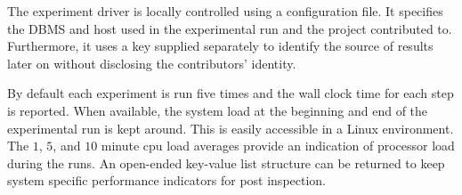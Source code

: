 \documentclass{cidr-2019}
\begin{document}
The experiment driver is locally controlled using a configuration
file. It specifies the DBMS and host used in the experimental run and
the project contributed to. Furthermore, it uses a key
supplied separately to identify the source of results later on without
disclosing the contributors' identity.

By default each experiment is run five times and the wall clock time
for each step is reported. When available, the system load at the
beginning and end of the experimental run is kept around. This is
easily accessible in a Linux environment. The $1$, $5$, and $10$ minute
{\sc cpu} load averages provide an indication of processor load during
the runs. An open-ended key-value list structure can be returned to
keep system specific performance indicators for post inspection.







\end{document}
